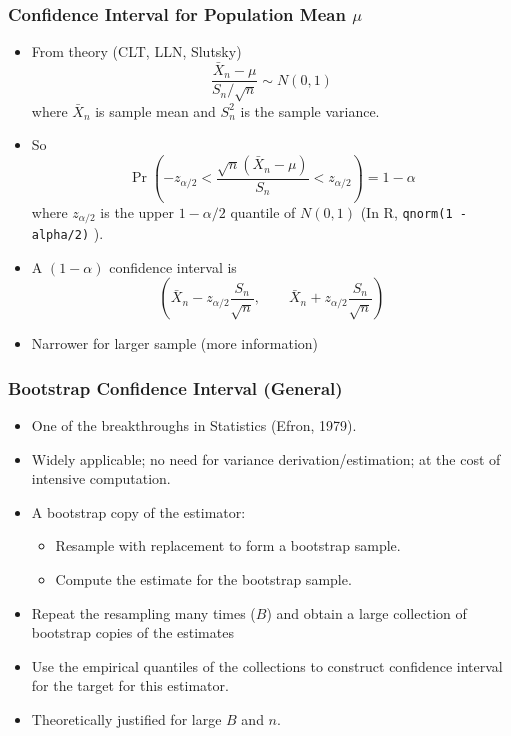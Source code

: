 \documentclass[leqno]{beamer}
\begin{document}
\begin{frame}
  \frametitle{Confidence Interval for Population Mean $\mu$}
  \begin{itemize}
  \item
    From theory (CLT, LLN, Slutsky)
    \[
      \frac{\bar X_n - \mu}{S_n/\sqrt{n}} \sim N(0, 1)
    \]
    where $\bar X_n$ is sample mean and $S_n^2$ is the sample variance.
  \item So
    \[
      \Pr\left(-z_{\alpha/2} < \frac{\sqrt{n}(\bar X_n - \mu)}{S_n}
        < z_{\alpha/2} \right)
      = 1 - \alpha
    \]
    where $z_{\alpha/2}$ is the upper $1 - \alpha/2$ quantile of
    $N(0, 1)$ (In R,  \texttt{qnorm(1 - alpha/2)} ).
    
  \item A $(1 - \alpha)$ confidence interval is
    \[
      \left(\bar X_n - z_{\alpha/2} \frac{ S_n }{\sqrt{n}}, \qquad
        \bar X_n + z_{\alpha/ 2} \frac{S_n} {\sqrt{n}}\right)
    \]
  \item Narrower for larger sample (more information)
  \end{itemize}
\end{frame}


\begin{frame}
  \frametitle{Bootstrap Confidence Interval (General)}
  \begin{itemize}
  \item
    One of the breakthroughs in Statistics (Efron, 1979).
  \item
    Widely applicable; no need for variance derivation/estimation; at the
    cost of intensive computation.
  \item A bootstrap copy of the estimator:
    \begin{itemize}
    \item Resample with replacement to form a bootstrap sample.
    \item Compute the estimate for the bootstrap sample.
    \end{itemize}
  \item Repeat the resampling many times ($B$) and obtain a large collection
    of bootstrap copies of the estimates
  \item Use the empirical quantiles of the collections to construct
    confidence interval for the target for this estimator.
  \item
    Theoretically justified for large $B$ and $n$.
   \end{itemize}
\end{frame}
\end{document}
